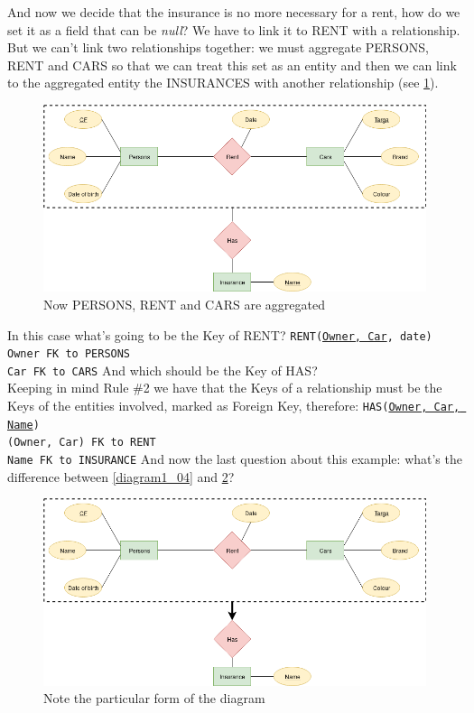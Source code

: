 \documentclass[class=book, crop=false, oneside]{standalone}
\newcommand\tab[1][1cm]{\hspace*{#1}}
\begin{document}
And now we decide that the insurance is no more necessary for a rent, how do we set it as a field that can be \emph{null}?
We have to link it to RENT with a relationship.
But we can't link two relationships together: we must aggregate PERSONS, RENT and CARS so that we can treat this set as an entity and then we can link to the aggregated entity the INSURANCES with another relationship (see \ref{diagram1_05}).
\begin{figure}[H]
	\includegraphics[width=\textwidth,keepaspectratio]{diagram1_05.png}
	\caption{Now PERSONS, RENT and CARS are aggregated}
	\label{diagram1_05}
\end{figure}
In this case what's going to be the Key of RENT?
\vskip 10pt
\texttt{RENT(\underline{Owner, Car}, date)}\\
	\tab[.8cm] \texttt{Owner FK to PERSONS}\\
	\tab[.8cm] \texttt{Car FK to CARS}
\vskip 10pt
\noindent And which should be the Key of HAS?\\
Keeping in mind Rule \#2 we have that the Keys of a relationship must be the Keys of the entities involved, marked as Foreign Key, therefore:
\vskip 10pt
\texttt{HAS(\underline{Owner, Car, Name})}\\
	\tab[.8cm] \texttt{(Owner, Car) FK to RENT}\\
	\tab[.8cm] \texttt{Name FK to INSURANCE}
\vskip 10pt
And now the last question about this example: what's the difference between \ref{diagram1_04} and \ref{diagram1_06}?
\begin{figure}[H]
	\includegraphics[width=\textwidth,keepaspectratio]{diagram1_06.png}
	\caption{Note the particular form of the diagram}
	\label{diagram1_06}
\end{figure}
\end{document}
